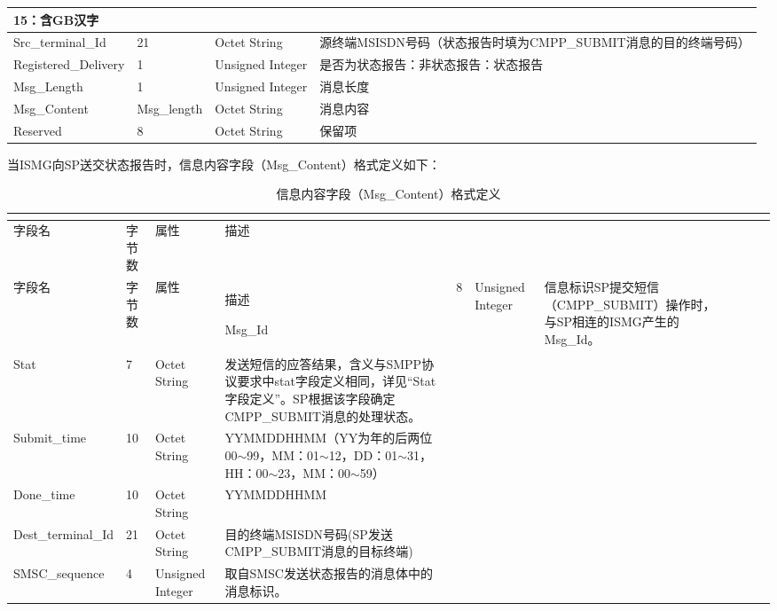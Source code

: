 \documentclass[11pt]{book} %
\begin{document}
\begin{longtable}{|m{85pt}|m{50pt}|m{80pt}|m{190pt}|}
15：含GB汉字\\
\hline
Src\_terminal\_Id&21&Octet String&源终端MSISDN号码（状态报告时填为CMPP\_SUBMIT消息的目的终端号码）\\
\hline
Registered\_Delivery&1&Unsigned Integer&是否为状态报告\newline 
0：非状态报告\newline 
1：状态报告\\
\hline
Msg\_Length&1&Unsigned Integer&消息长度\\
\hline
Msg\_Content&Msg\_length&Octet String&消息内容\\
\hline
Reserved&8&Octet String&保留项\\
\hline
\end{longtable}


当ISMG向SP送交状态报告时，信息内容字段（Msg\_Content）格式定义如下：


\begin{longtable}{|m{75pt}|m{35pt}|m{75pt}|m{235pt}|}
\tabularnewline\hline
字段名&字节数&属性&描述
\endhead

\caption{信息内容字段（Msg\_Content）格式定义}\\
\hline
字段名&字节数&属性&描述
\endfirsthead

\endfoot

\endlastfoot

\hline
Msg\_Id&8&Unsigned Integer&信息标识\newline SP提交短信（CMPP\_SUBMIT）操作时，与SP相连的ISMG产生的Msg\_Id。\\
\hline
Stat&7&Octet String&发送短信的应答结果，含义与SMPP协议要求中stat字段定义相同，详见“Stat字段定义”。SP根据该字段确定CMPP\_SUBMIT消息的处理状态。\\
\hline
Submit\_time&10&Octet String&YYMMDDHHMM（YY为年的后两位00$\sim$99，MM：01$\sim$12，DD：01$\sim$31，HH：00$\sim$23，MM：00$\sim$59）\\
\hline
Done\_time&10&Octet String&YYMMDDHHMM\\
\hline
Dest\_terminal\_Id&21&Octet String&目的终端MSISDN号码(SP发送CMPP\_SUBMIT消息的目标终端)\\
\hline
SMSC\_sequence&4&Unsigned Integer&取自SMSC发送状态报告的消息体中的消息标识。\\
\hline
\end{longtable}
\end{document}
